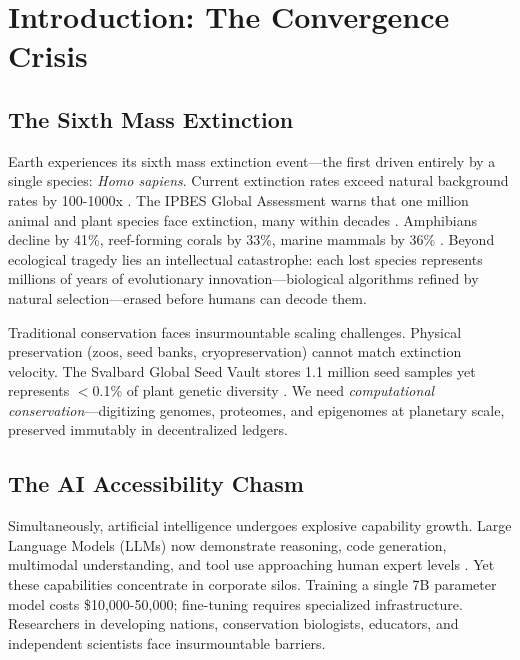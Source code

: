 \section{Introduction: The Convergence Crisis}


\subsection{The Sixth Mass Extinction}

Earth experiences its sixth mass extinction event—the first driven entirely by a single species: \textit{Homo sapiens}. Current extinction rates exceed natural background rates by 100-1000x \citep{ceballos2015accelerated}. The IPBES Global Assessment warns that one million animal and plant species face extinction, many within decades \citep{ipbes2019global}. Amphibians decline by 41\%, reef-forming corals by 33\%, marine mammals by 36\% \citep{wwf2020living}. Beyond ecological tragedy lies an intellectual catastrophe: each lost species represents millions of years of evolutionary innovation—biological algorithms refined by natural selection—erased before humans can decode them.

Traditional conservation faces insurmountable scaling challenges. Physical preservation (zoos, seed banks, cryopreservation) cannot match extinction velocity. The Svalbard Global Seed Vault stores 1.1 million seed samples yet represents $<$0.1\% of plant genetic diversity \citep{svalbard2023report}. We need \textit{computational conservation}—digitizing genomes, proteomes, and epigenomes at planetary scale, preserved immutably in decentralized ledgers.

\subsection{The AI Accessibility Chasm}

Simultaneously, artificial intelligence undergoes explosive capability growth. Large Language Models (LLMs) now demonstrate reasoning, code generation, multimodal understanding, and tool use approaching human expert levels \citep{openai2024gpt4,anthropic2024claude,alibaba2024qwen}. Yet these capabilities concentrate in corporate silos. Training a single 7B parameter model costs \$10,000-50,000; fine-tuning requires specialized infrastructure. Researchers in developing nations, conservation biologists, educators, and independent scientists face insurmountable barriers.

